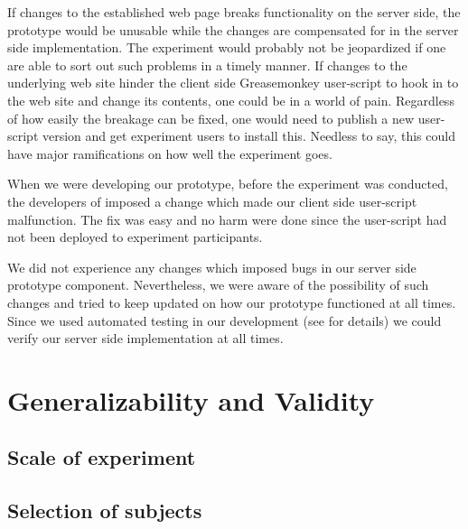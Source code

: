 \begin{items}
   If changes to the established web page breaks
    functionality on the server side, the prototype would be unusable
    while the changes are compensated for in the server side implementation.
    The experiment would probably not be jeopardized if
    one are able to sort out such problems in a timely manner.
   If changes to the underlying web site hinder the client
    side Greasemonkey user-script to hook in to the web site and change its
    contents, one could be in a world of pain. Regardless of how easily the
    breakage can be fixed, one would need to publish a new user-script version
    and get experiment users to install this. Needless to say, this could
    have major ramifications on how well the experiment goes.
\end{items}

When we were developing our prototype, before the experiment was conducted,
the developers of \urort{} imposed a change which made our client side
user-script malfunction. The fix was easy and no harm were done since the
user-script had not been deployed to experiment participants.

We did not experience any changes which imposed bugs in our server side
prototype component. Nevertheless, we were aware of the possibility of such
changes and tried to keep updated on how our prototype functioned at all
times. Since we used automated testing in our development (see
 for details) we could verify
our server side implementation at all times.

\section{Generalizability and Validity}

\subsection{Scale of experiment}


\subsection{Selection of subjects}


